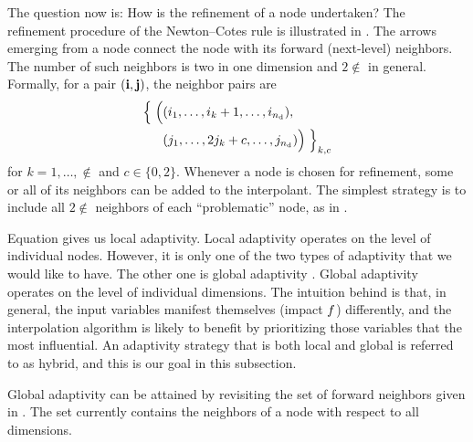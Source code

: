 The question now is: How is the refinement of a node undertaken? The refinement
procedure of the Newton--Cotes rule is illustrated in . The arrows
emerging from a node connect the node with its forward (next-level) neighbors.
The number of such neighbors is two in one dimension and $2 \nin$ in general.
Formally, for a pair $(\mathbf{i}, \mathbf{j})$, the neighbor pairs are
\begin{align}
  \left\{\vphantom{\Big(}\right. \Big( &(i_1, \dots,   i_k + 1, \dots, i_\nin), \elab{neighbors} \\
                                       &(j_1, \dots, 2 j_k + c, \dots, j_\nin) \Big) \left.\vphantom{\Big)} \right\}_{k, c} \nonumber
\end{align}
for $k = 1, \dots, \nin$ and $c \in \{ 0, 2 \}$. Whenever a node is chosen for
refinement, some or all of its neighbors can be added to the interpolant. The
simplest strategy is to include all $2 \nin$ neighbors of each ``problematic''
node, as in \cite{ma2009}.

Equation  gives us local adaptivity. Local adaptivity operates on
the level of individual nodes. However, it is only one of the two types of
adaptivity that we would like to have. The other one is global adaptivity
\cite{klimke2006}. Global adaptivity operates on the level of individual
dimensions. The intuition behind is that, in general, the input variables
manifest themselves (impact $f$) differently, and the interpolation algorithm
is likely to benefit by prioritizing those variables that the most influential.
An adaptivity strategy that is both local and global is referred to as hybrid,
and this is our goal in this subsection.

Global adaptivity can be attained by revisiting the set of forward neighbors
given in . The set currently contains the neighbors of a node
with respect to all dimensions.
